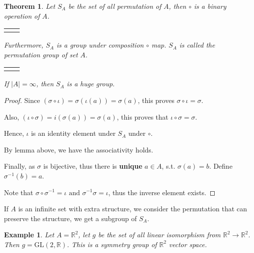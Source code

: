 \documentclass{article}
\theoremstyle{MyNonumberplain}
\theoremstyle{break}
\newtheorem*{proof}{Proof. }
\newcommand{\nline}{\begin{tabular}{ll}&\\\end{tabular}}
\newcommand{\infixand}{\text{ and }}
\theoremstyle{break}
\newtheorem{theorem}{Theorem}[section]
\newtheorem{example}{Example}[section]
\theoremstyle{break}
\theoremstyle{definition}
\theoremstyle{break}
\begin{document}
\begin{thmbox}
    \begin{theorem}
        Let $S_A$ be the set of all permutation of $A$, then $\circ$ is a binary
        operation of $A$.

        \nline

        Furthermore, $S_A$ is a group under composition $\circ$ map. $S_A$ is called the permutation group of set $A$.

        \nline

        If $| A | = \infty$, then $S_A$ is a huge group.
    \end{theorem}
    \begin{prfbox}
        \begin{proof}
            Since $(\sigma \circ \iota) = \sigma (\iota (a)) = \sigma (a)$, this
            proves $\sigma \circ \iota = \sigma$.\bigskip

            Also, $(\iota \circ \sigma) = i (\sigma (a)) = \sigma (a)$, this proves that
            $\iota \circ \sigma = \sigma$.\bigskip

            Hence, $\iota$ is an identity element under $S_A$ under $\circ$.\bigskip

            By lemma above, we have the associativity holds.\bigskip

            Finally, as $\sigma$ is bijective, thus there is \textbf{unique} $a \in A$, s.t. $\sigma (a)
            = b$. Define $\sigma^{- 1} (b) = a$.\bigskip

            Note that $\sigma \circ \sigma^{- 1} = \iota \infixand \sigma^{- 1} \sigma =
            \iota$, thus the inverse element exists.
        \end{proof}
    \end{prfbox}
\end{thmbox}

If $A$ is an infinite set with extra structure, we consider the permutation that can preserve the structure, we get a subgroup of $S_A$. 

\begin{expbox}
    \begin{example}
        Let $A =\mathbb{R}^2$, let $g$ be the set of all linear isomorphism from
        $\mathbb{R}^2 \to \mathbb{R}^2$. Then $g = \text{GL} (2, \mathbb{R})$.
        This is a symmetry group of $\mathbb{R}^2$ vector space. 
    \end{example}
\end{expbox}
\end{document}
